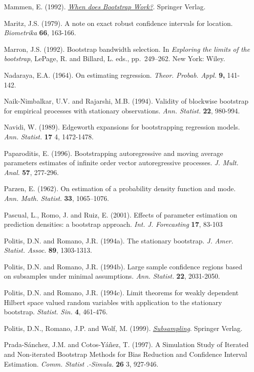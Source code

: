 \documentclass[]{book}
\theoremstyle{definition}
\theoremstyle{definition}
\theoremstyle{definition}
\theoremstyle{remark}
\begin{document}
Mammen, E. (1992).
\href{https://books.google.es/books?hl=es\&lr=\&id=zpDfBwAAQBAJ\&oi=fnd\&pg=PP8\&dq=When+does+Bootstrap+Work\%3F}{\emph{When
does Bootstrap Work?}}. Springer Verlag.

Maritz, J.S. (1979). A note on exact robust confidence intervals for
location. \emph{Biometrika} \textbf{66}, 163-166.

Marron, J.S. (1992). Bootstrap bandwidth selection. In \emph{Exploring
the limits of the bootstrap}, LePage, R. and Billard, L. eds.,
pp.~249--262. New York: Wiley.

Nadaraya, E.A. (1964). On estimating regression. \emph{Theor. Probab.
Appl.} \textbf{9,} 141-142.

Naik-Nimbalkar, U.V. and Rajarshi, M.B. (1994). Validity of blockwise
bootstrap for empirical processes with stationary observations.
\emph{Ann. Statist.} \textbf{22}, 980-994.

Navidi, W. (1989). Edgeworth expansions for bootstrapping regression
models. \emph{Ann. Statist.} \textbf{17} 4, 1472-1478.

Paparoditis, E. (1996). Bootstrapping autoregressive and moving average
parameters estimates of infinite order vector autoregressive processes.
\emph{J. Mult. Anal.} \textbf{57}, 277-296.

Parzen, E. (1962). On estimation of a probability density function and
mode. \emph{Ann. Math. Statist.} \textbf{33}, 1065--1076.

Pascual, L., Romo, J. and Ruiz, E. (2001). Effects of parameter
estimation on prediction densities: a bootstrap approach. \emph{Int. J.
Forecasting} \textbf{17}, 83-103

Politis, D.N. and Romano, J.R. (1994a). The stationary bootstrap.
\emph{J. Amer. Statist. Assoc.} \textbf{89}, 1303-1313.

Politis, D.N. and Romano, J.R. (1994b). Large sample confidence regions
based on subsamples under minimal assumptions. \emph{Ann. Statist.}
\textbf{22}, 2031-2050.

Politis, D.N. and Romano, J.R. (1994c). Limit theorems for weakly
dependent Hilbert space valued random variables with application to the
stationary bootstrap. \emph{Statist. Sin.} \textbf{4}, 461-476.

Politis, D.N., Romano, J.P. and Wolf, M. (1999).
\href{https://books.google.es/books?hl=es\&lr=\&id=nGu6rqjE6JoC\&oi=fnd\&pg=PR7\&dq=Subsampling}{\emph{Subsampling}}.
Springer Verlag.

Prada-Sánchez, J.M. and Cotos-Yáñez, T. (1997). A Simulation Study of
Iterated and Non-iterated Bootstrap Methods for Bias Reduction and
Confidence Interval Estimation. \emph{Comm. Statist .-Simula.}
\textbf{26} 3, 927-946.
\end{document}

